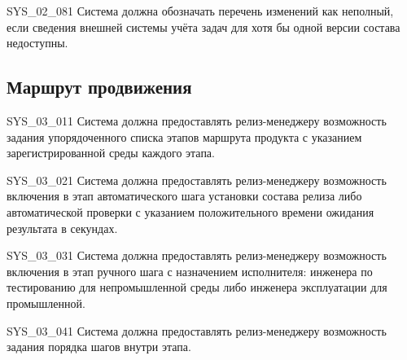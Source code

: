\documentclass{tpks}
\begin{document}
\begin{req}{SYS_02_08}{1}
Система должна обозначать перечень изменений как неполный, если сведения внешней системы учёта задач для хотя бы одной версии состава недоступны.
\end{req}

\subsection{Маршрут продвижения}

\begin{req}{SYS_03_01}{1}
Система должна предоставлять релиз-менеджеру возможность задания упорядоченного списка этапов маршрута продукта с указанием зарегистрированной среды каждого этапа.
\end{req}

\begin{req}{SYS_03_02}{1}
Система должна предоставлять релиз-менеджеру возможность включения в этап автоматического шага установки состава релиза либо автоматической проверки с указанием положительного времени ожидания результата в секундах.
\end{req}

\begin{req}{SYS_03_03}{1}
Система должна предоставлять релиз-менеджеру возможность включения в этап ручного шага с назначением исполнителя: инженера по тестированию для непромышленной среды либо инженера эксплуатации для промышленной.
\end{req}

\begin{req}{SYS_03_04}{1}
Система должна предоставлять релиз-менеджеру возможность задания порядка шагов внутри этапа.
\end{req}
\end{document}
